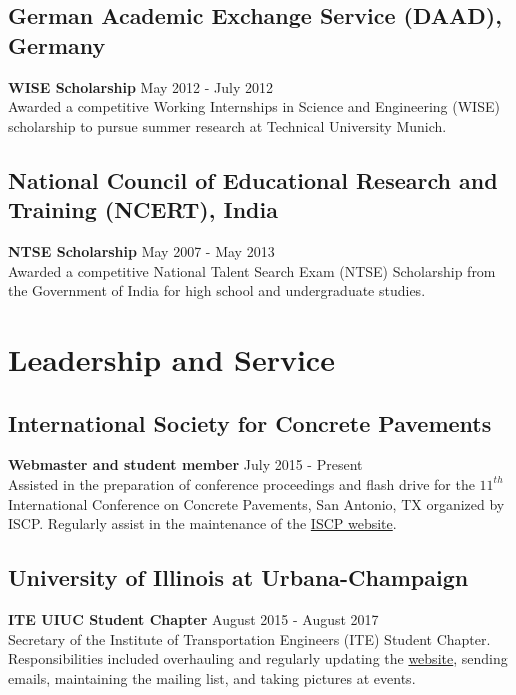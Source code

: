 \documentclass[12pt]{article}
\begin{document}
\subsection*{German Academic Exchange Service (DAAD), Germany} 
\textbf{WISE Scholarship} \hfill May 2012 - July 2012 \\
Awarded a competitive Working Internships in Science and Engineering (WISE) scholarship to pursue summer research at Technical University Munich. \\

\subsection*{National Council of Educational Research and Training (NCERT), India} 
\textbf{NTSE Scholarship} \hfill May 2007 - May 2013 \\
Awarded a competitive National Talent Search Exam (NTSE) Scholarship from the Government of India for high school and undergraduate studies. \\

\section*{Leadership and Service}
\subsection*{International Society for Concrete Pavements}
\textbf{Webmaster and student member} \hfill July 2015 - Present \\
Assisted in the preparation of conference proceedings and flash drive for the $11^{th}$ International Conference on Concrete Pavements, San Antonio, TX organized by ISCP. Regularly assist in the maintenance of the \href{concretepavements.org}{ISCP website}. \\

\subsection*{University of Illinois at Urbana-Champaign} 
\textbf{ITE UIUC Student Chapter} \hfill August 2015 - August 2017 \\
Secretary of the Institute of Transportation Engineers (ITE) Student Chapter. Responsibilities included overhauling and regularly updating the \href{https://iteuiuc.wordpress.com/}{website}, sending emails, maintaining the mailing list, and taking pictures at events. \\
\end{document}
